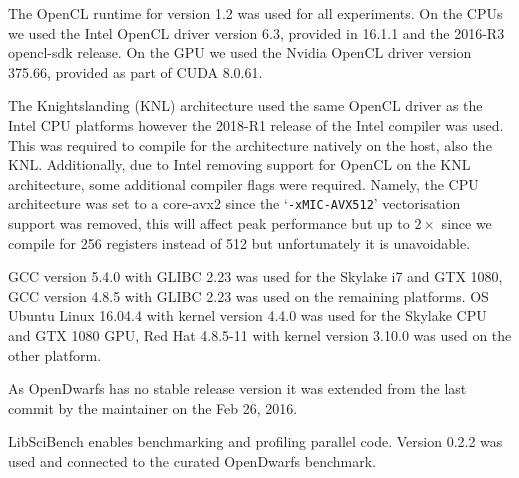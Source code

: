 \documentclass[../document.tex]{subfiles}
\begin{document}
\label{ssec:software}

The OpenCL runtime for version 1.2 was used for all experiments.
On the CPUs we used the Intel OpenCL driver version 6.3, provided in 16.1.1 and the 2016-R3 opencl-sdk release.
On the GPU we used the Nvidia OpenCL driver version 375.66, provided as part of CUDA 8.0.61.

The Knightslanding (KNL) architecture used the same OpenCL driver as the Intel CPU platforms however the 2018-R1 release of the Intel compiler was used.
This was required to compile for the architecture natively on the host, also the KNL.
Additionally, due to Intel removing support for OpenCL on the KNL architecture, some additional compiler flags were required.
Namely, the CPU architecture was set to a core-avx2 since the `{\tt -xMIC-AVX512}' vectorisation support was removed, this will affect peak performance but up to $2\times$ since we compile for \SI{256}{\bit} registers instead of \SI{512}{\bit} but unfortunately it is unavoidable.

GCC version 5.4.0 with GLIBC 2.23 was used for the Skylake i7 and GTX 1080,  
GCC version 4.8.5 with GLIBC 2.23 was used on the remaining platforms.
OS Ubuntu Linux 16.04.4 with kernel version 4.4.0 was used for the Skylake CPU and GTX 1080 GPU, Red Hat 4.8.5-11 with kernel version 3.10.0 was used on the other platform.

As OpenDwarfs has no stable release version it was extended from the last commit by the maintainer on the Feb 26, 2016.

LibSciBench enables benchmarking and profiling parallel code.
Version 0.2.2 was used and connected to the curated OpenDwarfs benchmark.
\end{document}
